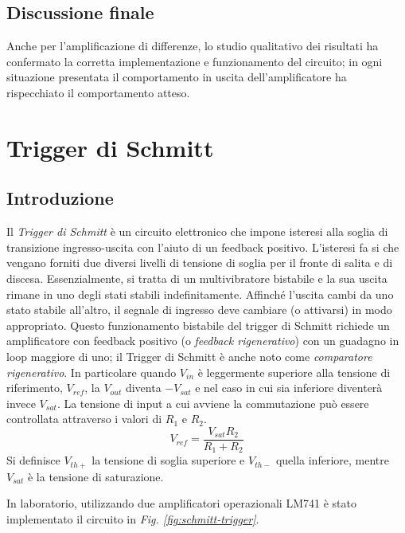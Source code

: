 \documentclass[journal]{IEEEtran}
\begin{document}
\subsection{\textbf{Discussione finale}}
Anche per l'amplificazione di differenze, lo studio qualitativo dei risultati ha confermato la corretta implementazione e funzionamento del circuito; in ogni situazione presentata il comportamento in uscita dell'amplificatore ha rispecchiato il comportamento atteso.

\section{\textbf{Trigger di Schmitt}} 
\subsection{\textbf{Introduzione}}
Il \textit{Trigger di Schmitt} è un circuito elettronico che impone isteresi alla soglia di transizione ingresso-uscita con l'aiuto di un feedback positivo. L'isteresi fa si che vengano forniti due diversi livelli di tensione di soglia per il fronte di salita e di discesa. Essenzialmente, si tratta di un multivibratore bistabile e la sua uscita rimane in uno degli stati stabili indefinitamente. Affinché l'uscita cambi da uno stato stabile all'altro, il segnale di ingresso deve cambiare (o attivarsi) in modo appropriato. Questo funzionamento bistabile del trigger di Schmitt richiede un amplificatore con feedback positivo (o \textit{feedback rigenerativo}) con un guadagno in loop maggiore di uno; il Trigger di Schmitt è anche noto come \textit{comparatore rigenerativo}.
In particolare quando $V_{in}$ è leggermente superiore alla tensione di riferimento, $V_{ref}$, la $V_{out}$ diventa $-V_{sat}$ e nel caso in cui sia inferiore diventerà invece $V_{sat}$. La tensione di input a cui avviene la commutazione può essere controllata attraverso i valori di $R_1$ e $R_2$.
\[V_{ref} = \frac{V_{sat}R_2}{R_1+R_2}\]
Si definisce $V_{th+}$ la tensione di soglia superiore e $V_{th-}$ quella inferiore, mentre $V_{sat}$ è la tensione di saturazione.

In laboratorio, utilizzando due amplificatori operazionali LM741 è stato implementato il circuito in \textit{Fig. \ref{fig:schmitt-trigger}}.
\end{document}
